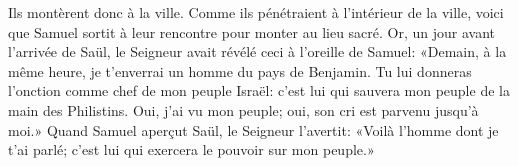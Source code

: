 Ils montèrent donc à la ville.
Comme ils pénétraient à l’intérieur de la ville,
	voici que Samuel sortit à leur rencontre pour monter au lieu sacré.
Or, un jour avant l’arrivée de Saül, le Seigneur avait révélé ceci à l’oreille de Samuel:
«Demain, à la même heure, je t’enverrai un homme du pays de Benjamin.
Tu lui donneras l’onction comme chef de mon peuple Israël:
	c’est lui qui sauvera mon peuple de la main des Philistins.
Oui, j’ai vu mon peuple; oui, son cri est parvenu jusqu’à moi.»
Quand Samuel aperçut Saül, le Seigneur l’avertit:
	«Voilà l’homme dont je t’ai parlé; c’est lui qui exercera le pouvoir sur mon peuple.»
